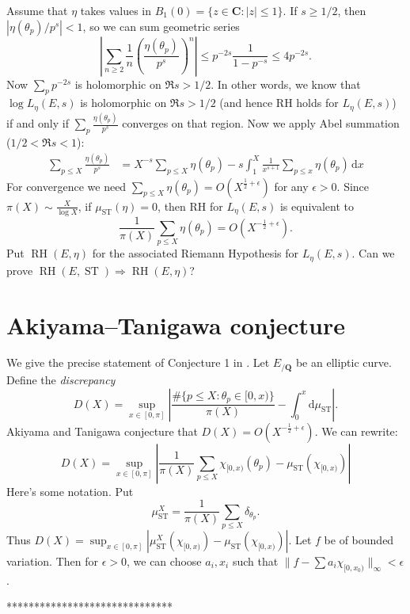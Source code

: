 \documentclass{article}
\DeclareMathOperator{\RH}{RH}
\DeclareMathOperator{\ST}{ST}
\newcommand{\bC}{\mathbf{C}}
\newcommand{\bQ}{\mathbf{Q}}
\newcommand{\dd}{\mathrm{d}}
\numberwithin{theorem}{section}
\begin{document}
Assume that $\eta$ takes values in $B_1(0) = \{z\in \bC : |z|\leqslant 1\}$. 
If $s\geqslant 1/2$, then $|\eta(\theta_p) / p^s|<1$, so we can sum geometric 
series
\[
	\left| \sum_{n\geqslant 2} \frac{1}{n} \left(\frac{\eta(\theta_p)}{p^s}\right)^n \right|
		\leqslant p^{-2s} \frac{1}{1-p^{-s}} 
		\leqslant 4 p^{-2s}.
\]
Now $\sum_p p^{-2s}$ is holomorphic on $\Re s>1/2$. In other words, we know 
that $\log L_\eta(E,s)$ is holomorphic on $\Re s>1/2$ (and hence RH holds for 
$L_\eta(E,s)$) if and only if $\sum_p \frac{\eta(\theta_p)}{p^s}$ converges 
on that region. Now we apply Abel summation ($1/2<\Re s<1$):
\begin{align*}
	\sum_{p\leqslant X} \frac{\eta(\theta_p)}{p^s}
		&= X^{-s} \sum_{p\leqslant X} \eta(\theta_p) - s\int_1^X \frac{1}{x^{s+1}} \sum_{p\leqslant x} \eta(\theta_p) \, \dd x
\end{align*}
For convergence we need 
$\sum_{p\leqslant X} \eta(\theta_p) = O(X^{\frac 1 2 +\epsilon})$ for any 
$\epsilon>0$. Since $\pi(X) \sim \frac{X}{\log X}$, if $\mu_{\ST}(\eta)=0$, 
then RH for $L_\eta(E,s)$ is equivalent to 
\[
	\frac{1}{\pi(X)}\sum_{p\leqslant X} \eta(\theta_p) = O(X^{-\frac 1 2 + \epsilon}) .
\]
Put $\RH(E,\eta)$ for the associated Riemann Hypothesis for $L_\eta(E,s)$. 
Can we prove $\RH(E,\ST)\Rightarrow \RH(E,\eta)$?




\section{Akiyama--Tanigawa conjecture}

We give the precise statement of Conjecture 1 in \cite{akiyama-tanigawa}. 
Let $E_{/\bQ}$ be an elliptic curve. Define the \emph{discrepancy} 
\[
	D(X) = \sup_{x\in [0,\pi]} \left| \frac{\# \{p\leqslant X : \theta_p\in [0,x)\}}{\pi(X)} - \int_0^x \dd \mu_{\ST} \right| .
\]
Akiyama and Tanigawa conjecture that $D(X)=O(X^{-\frac 1 2+\epsilon})$. 
We can rewrite:
\[
	D(X) = \sup_{x\in [0,\pi]} \left| \frac{1}{\pi(X)} \sum_{p\leqslant X} \chi_{[0,x)}(\theta_p) - \mu_{\ST}(\chi_{[0,x)})\right|
\]
Here's some notation. Put
\[
	\mu_{\ST}^X = \frac{1}{\pi(X)} \sum_{p\leqslant X} \delta_{\theta_p} .
\]
Thus 
$D(X)=\sup_{x\in [0,\pi]} |\mu_{\ST}^X(\chi_{[0,x)}) - \mu_{\ST}(\chi_{[0,x)})|$. 
Let $f$ be of bounded variation. Then for $\epsilon>0$, we can choose 
$a_i,x_i$ such that $\|f-\sum a_i \chi_{[0,x_0)}\|_\infty<\epsilon$. 

******************************
\end{document}

